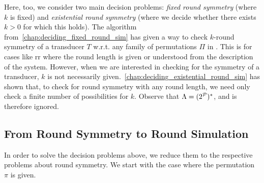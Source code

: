 Here, too, we consider two main decision problems: \emph{fixed round symmetry} (where $k$ is fixed) and \emph{existential round symmetry} (where we decide whether there exists $k>0$ for which this holds). The algorithm from~\cref{chap:deciding_fixed_round_sim} has given a way to check $k$-round symmetry of a transducer $T$ w.r.t.\! any family of permutations $\Pi$ in \PSPACE. This is for cases like \gls{rr} where the round length is given or understood from the description of the system. However, when we are interested in checking for the symmetry of a transducer, $k$ is not necessarily given.~\cref{chap:deciding_existential_round_sim} has shown that, to check for round symmetry with any round length, we need only check a finite number of possibilities for $k$. Observe that $\Lambda=(2^{\mathcal{P}})^*$, and is therefore ignored.

\subsection*{From Round Symmetry to Round Simulation}
\label{sec:symmetry_to_simulation}
In order to solve the decision problems above, we reduce them to the respective problems about round symmetry. We start with the case where the permutation $\pi$ is given.

